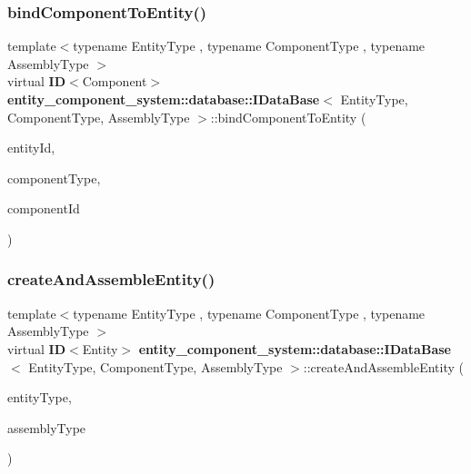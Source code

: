 \subsubsection{bind\+Component\+To\+Entity()}
{\footnotesize\ttfamily template$<$typename Entity\+Type , typename Component\+Type , typename Assembly\+Type $>$ \\
virtual {\bf ID}$<$Component$>$ {\bf entity\+\_\+component\+\_\+system\+::database\+::\+I\+Data\+Base}$<$ Entity\+Type, Component\+Type, Assembly\+Type $>$\+::bind\+Component\+To\+Entity (\begin{DoxyParamCaption}\item[{{\bf ID}$<$ Entity $>$ const \&}]{entity\+Id,  }\item[{Component\+Type const}]{component\+Type,  }\item[{{\bf ID}$<$ Component $>$ const \&}]{component\+Id }\end{DoxyParamCaption})\hspace{0.3cm}{\ttfamily [pure virtual]}}

\label{classentity__component__system_1_1database_1_1_i_data_base_a41c7ed5f04ac166e142878e32ae5e3e5} 
\subsubsection{create\+And\+Assemble\+Entity()}
{\footnotesize\ttfamily template$<$typename Entity\+Type , typename Component\+Type , typename Assembly\+Type $>$ \\
virtual {\bf ID}$<$Entity$>$ {\bf entity\+\_\+component\+\_\+system\+::database\+::\+I\+Data\+Base}$<$ Entity\+Type, Component\+Type, Assembly\+Type $>$\+::create\+And\+Assemble\+Entity (\begin{DoxyParamCaption}\item[{Entity\+Type const}]{entity\+Type,  }\item[{Assembly\+Type const}]{assembly\+Type }\end{DoxyParamCaption})\hspace{0.3cm}{\ttfamily [pure virtual]}}

\label{classentity__component__system_1_1database_1_1_i_data_base_ac3b147adcd7971a7925affabb81ee6bb} 
